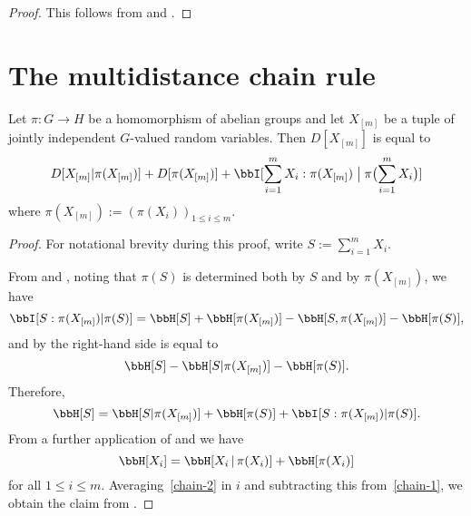 \begin{proof}\leanok  This follows from  and .
\end{proof}

\section{The multidistance chain rule}

\begin{lemma}\label{multidist-chain-rule}\leanok  Let $\pi \colon G \to H$ be a homomorphism of abelian groups and let $X_{[m]}$ be a tuple of jointly independent $G$-valued random variables.  Then $D[X_{[m]}]$ is equal to
  \begin{equation}
      D[ X_{[m]} | \pi(X_{[m]}) ]  +D[ \pi(X_{[m]}) ]  + \bbI[ \sum_{i=1}^m X_i  : \pi(X_{[m]}) \; \big| \; \pi\bigl(\sum_{i=1}^m X_i\bigr) ]
    \label{chain-eq}
  \end{equation}
  where $\pi(X_{[m]}) := (\pi(X_i))_{1 \leq i \leq m}$.
  \end{lemma}

  \begin{proof}\leanok For notational brevity during this proof, write $S := \sum_{i=1}^m X_i$.

    From  and , noting that $\pi(S)$ is determined both by $S$ and by $\pi(X_{[m]})$, we have
  \begin{equation*}
   \bbI[S:\pi(X_{[m]})|\pi(S)] = \bbH[S]+\bbH[\pi(X_{[m]})]-\bbH[S,\pi(X_{[m]})]-\bbH[\pi(S)],
  \end{equation*}
  and by  the right-hand side is equal to
  \begin{equation*}
  \bbH[S]-\bbH[S|\pi(X_{[m]})]-\bbH[\pi(S)].
  \end{equation*}
  Therefore,
  \begin{equation}\label{chain-1}
  \bbH[S]=\bbH[S|\pi(X_{[m]})]+\bbH[\pi(S)]+\bbI[S:\pi(X_{[m]})|\pi(S)]. \end{equation}
  From a further application of  and  we have
  \begin{equation}\label{chain-2}
    \bbH[X_i] = \bbH[X_i \, | \, \pi(X_i)] + \bbH[\pi(X_i)]
  \end{equation}
  for all $1 \leq i \leq m$.  Averaging~\eqref{chain-2} in $i$ and subtracting this from~\eqref{chain-1}, we obtain the claim from .
  \end{proof}

